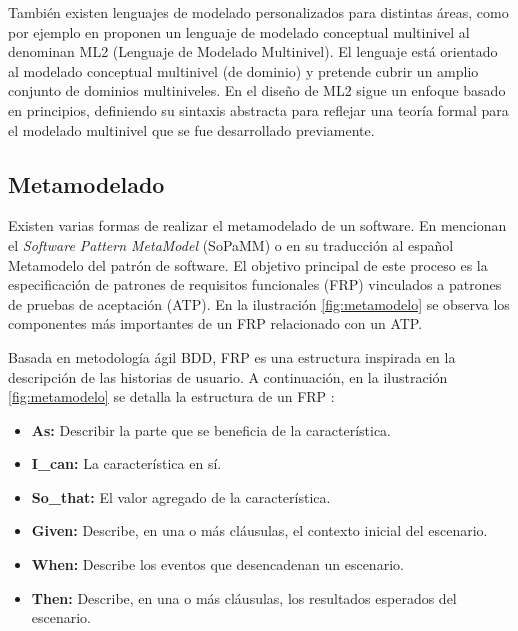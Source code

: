 \sloppy
También existen lenguajes de modelado personalizados para distintas áreas, como por ejemplo en \cite{Multi-level} proponen un lenguaje de modelado conceptual multinivel al denominan ML2 (Lenguaje de Modelado Multinivel). El lenguaje está orientado al modelado conceptual multinivel (de dominio) y pretende cubrir un amplio conjunto de dominios multiniveles. En el diseño de ML2 sigue un enfoque basado en principios, definiendo su sintaxis abstracta para reflejar una teoría formal para el modelado multinivel que se fue desarrollado previamente.

\subsection{Metamodelado}

Existen varias formas de realizar el metamodelado de un software. En \cite{Mohamed} mencionan el \textit{Software Pattern MetaModel} (SoPaMM) o en su traducción al español Metamodelo del patrón de software. El objetivo principal de este proceso es la especificación de patrones de requisitos funcionales (FRP) vinculados a patrones de pruebas de aceptación (ATP). En la ilustración \ref{fig:metamodelo} se observa los componentes más importantes de un FRP relacionado con un ATP.

Basada en metodología ágil BDD, FRP es una estructura inspirada en la descripción de las historias de usuario. A continuación, en la ilustración \ref{fig:metamodelo} se detalla la estructura de un FRP \cite{Mohamed}:

\begin{itemize}
	\item \textbf{As: }Describir la parte que se beneficia de la característica.
	\item \textbf{I\_can: }La característica en sí.
	\item \textbf{So\_that:} El valor agregado de la característica.
	\item \textbf{Given:} Describe, en una o más cláusulas, el contexto inicial del escenario.
	\item \textbf{When:} Describe los eventos que desencadenan un escenario.
	\item \textbf{Then:} Describe, en una o más cláusulas, los resultados esperados del escenario.
\end{itemize}

